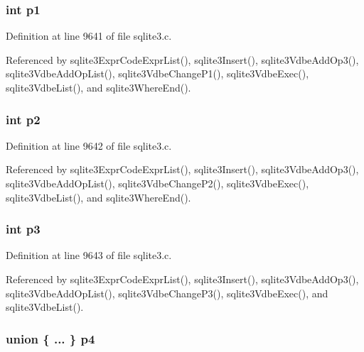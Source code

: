 \subsubsection[{p1}]{\setlength{\rightskip}{0pt plus 5cm}int p1}\label{struct_vdbe_op_a8d5504470de9fec69f0389092910c500}


Definition at line 9641 of file sqlite3.\+c.



Referenced by sqlite3\+Expr\+Code\+Expr\+List(), sqlite3\+Insert(), sqlite3\+Vdbe\+Add\+Op3(), sqlite3\+Vdbe\+Add\+Op\+List(), sqlite3\+Vdbe\+Change\+P1(), sqlite3\+Vdbe\+Exec(), sqlite3\+Vdbe\+List(), and sqlite3\+Where\+End().

\hypertarget{struct_vdbe_op_a2fbbf5056a49832e7d5e73a15ae2ee05}{}
\subsubsection[{p2}]{\setlength{\rightskip}{0pt plus 5cm}int p2}\label{struct_vdbe_op_a2fbbf5056a49832e7d5e73a15ae2ee05}


Definition at line 9642 of file sqlite3.\+c.



Referenced by sqlite3\+Expr\+Code\+Expr\+List(), sqlite3\+Insert(), sqlite3\+Vdbe\+Add\+Op3(), sqlite3\+Vdbe\+Add\+Op\+List(), sqlite3\+Vdbe\+Change\+P2(), sqlite3\+Vdbe\+Exec(), sqlite3\+Vdbe\+List(), and sqlite3\+Where\+End().

\hypertarget{struct_vdbe_op_a72edc878cdc5f05f4217ec6330dc549c}{}
\subsubsection[{p3}]{\setlength{\rightskip}{0pt plus 5cm}int p3}\label{struct_vdbe_op_a72edc878cdc5f05f4217ec6330dc549c}


Definition at line 9643 of file sqlite3.\+c.



Referenced by sqlite3\+Expr\+Code\+Expr\+List(), sqlite3\+Insert(), sqlite3\+Vdbe\+Add\+Op3(), sqlite3\+Vdbe\+Add\+Op\+List(), sqlite3\+Vdbe\+Change\+P3(), sqlite3\+Vdbe\+Exec(), and sqlite3\+Vdbe\+List().

\hypertarget{struct_vdbe_op_acb5afc7054dbd94bb7d43e223c1f3ff4}{}
\subsubsection[{p4}]{\setlength{\rightskip}{0pt plus 5cm}union \{ ... \}   p4}\label{struct_vdbe_op_acb5afc7054dbd94bb7d43e223c1f3ff4}
\hypertarget{struct_vdbe_op_af515c435102c9e6e4002058086090e59}{}

